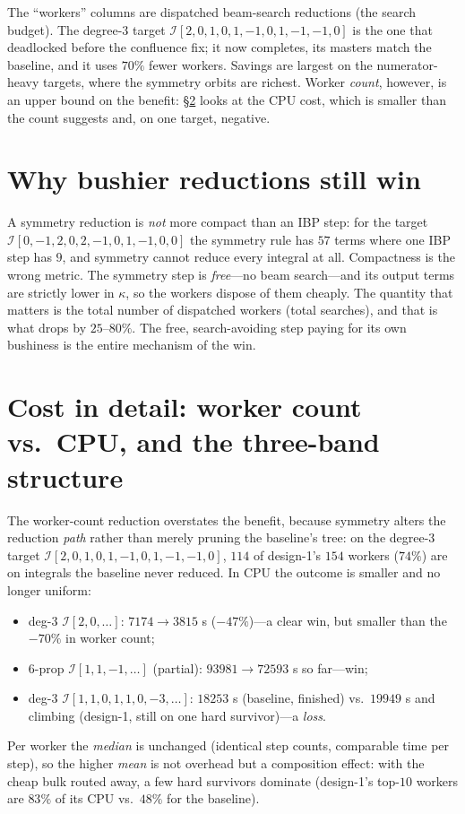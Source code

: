 \documentclass[11pt]{article}
\newcommand{\I}[1]{\mathcal{I}[#1]}
\newcommand{\kk}{\kappa}
\begin{document}
The ``workers'' columns are dispatched beam-search reductions (the search budget). The
degree-3 target $\I{2,0,1,0,1,-1,0,1,-1,-1,0}$ is the one that deadlocked before the
confluence fix; it now completes, its masters match the baseline, and it uses
$70\%$ fewer workers. Savings are largest on the numerator-heavy targets, where the
symmetry orbits are richest. Worker \emph{count}, however, is an upper bound on the
benefit: \S\ref{sec:cost} looks at the CPU cost, which is smaller than the count
suggests and, on one target, negative.

\section{Why bushier reductions still win}
A symmetry reduction is \emph{not} more compact than an IBP step: for the target
$\I{0,-1,2,0,2,-1,0,1,-1,0,0}$ the symmetry rule has $57$ terms where one IBP step has
$9$, and symmetry cannot reduce every integral at all. Compactness is the wrong metric.
The symmetry step is \emph{free}---no beam search---and its output terms are strictly
lower in $\kk$, so the workers dispose of them cheaply. The quantity that matters is
the total number of dispatched workers (total searches), and that is what drops by
$25$--$80\%$. The free, search-avoiding step paying for its own bushiness is the entire
mechanism of the win.

\section{Cost in detail: worker count vs.\ CPU, and the three-band structure}
\label{sec:cost}
The worker-count reduction overstates the benefit, because symmetry alters the
reduction \emph{path} rather than merely pruning the baseline's tree: on the degree-3
target $\I{2,0,1,0,1,-1,0,1,-1,-1,0}$, $114$ of design-1's $154$ workers ($74\%$) are on
integrals the baseline never reduced. In CPU the outcome is smaller and no longer
uniform:
\begin{itemize}
\item deg-3 $\I{2,0,\dots}$: $7174\to3815$ s ($-47\%$)---a clear win, but smaller than the
      $-70\%$ in worker count;
\item 6-prop $\I{1,1,-1,\dots}$ (partial): $93981\to72593$ s so far---win;
\item deg-3 $\I{1,1,0,1,1,0,-3,\dots}$: $18253$ s (baseline, finished) vs.\ $19949$ s and
      climbing (design-1, still on one hard survivor)---a \emph{loss}.
\end{itemize}
Per worker the \emph{median} is unchanged (identical step counts, comparable time per
step), so the higher \emph{mean} is not overhead but a composition effect: with the
cheap bulk routed away, a few hard survivors dominate (design-1's top-$10$ workers are
$83\%$ of its CPU vs.\ $48\%$ for the baseline).
\end{document}
